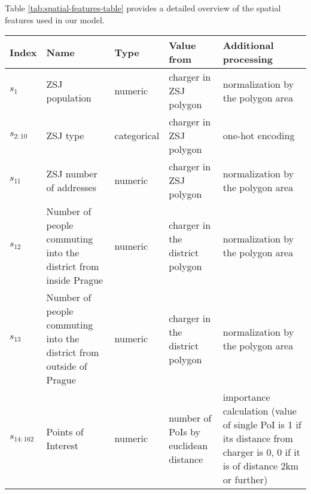 Table \ref{tab:spatial-features-table} provides a detailed overview of the spatial features used in our model.

\begin{table*}[h!]
    \def\arraystretch{1.5}
    \caption{Overview of spatial features used in the feature vector. The additional processing is described in Section \ref{sec:spatial-transformations}}
    \label{tab:spatial-features-table}
    \begin{tabular}{p{1cm} p{3.5cm} p{1.8cm} p{3.5cm} p{4.5cm}}
        \toprule
        \textbf{Index} & \textbf{Name}                                                       & \textbf{Type} & \textbf{Value from}                  & \textbf{Additional processing}                                                                                             \\
        \midrule
        $s_{1}$        & ZSJ population                                                      & numeric       & charger in ZSJ polygon               & normalization by the polygon area                                                                                          \\
        $s_{2:10}$     & ZSJ type                                                            & categorical   & charger in ZSJ polygon               & one-hot encoding                                                                                                           \\
        $s_{11}$       & ZSJ number of addresses                                             & numeric       & charger in ZSJ polygon               & normalization by the polygon area                                                                                          \\
        $s_{12}$       & Number of people commuting into the district from inside Prague     & numeric       & charger in the district polygon      & normalization by the polygon area                                                                                          \\
        $s_{13}$       & Number of people commuting into the district from outside of Prague & numeric       & charger in the district polygon      & normalization by the polygon area                                                                                          \\
        $s_{14:162}$   & Points of Interest                                                  & numeric       & number of PoIs by euclidean distance & importance calculation (value of single PoI is 1 if its distance from charger is 0, 0 if it is of distance 2km or further) \\
        \bottomrule
    \end{tabular}
\end{table*}

